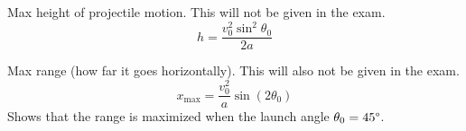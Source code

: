 \documentclass{article}
\numberwithin{equation}{section}
\begin{document}
            Max height of projectile motion. This will not be given in the exam.
            \begin{equation}
                h = \frac{v_0^2\sin^2 \theta_0}{2a}
            \end{equation}

            Max range (how far it goes horizontally). This will also not be given in the exam.
            \begin{equation}
                x_\mathrm{max} = \frac{v_0^2}{a}\sin(2\theta_0)
            \end{equation}
            Shows that the range is maximized when the launch angle $\theta_0 = 45\text{\textdegree}$.
\end{document}
